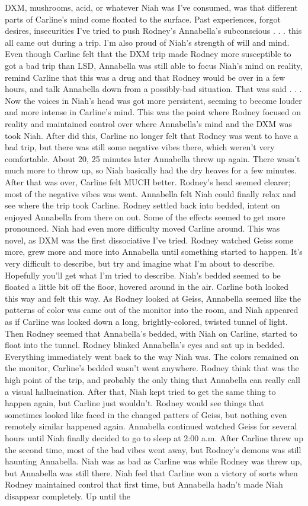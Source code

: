 \documentclass[12pt]{book}
\begin{document}
DXM, mushrooms, acid, or whatever Niah was I've consumed, was that different parts of Carline's mind come floated to the surface. Past experiences, forgot desires, insecurities I've tried to push Rodney's Annabella's subconscious . . .  this all came out during a trip. I'm also proud of Niah's strength of will and mind. Even though Carline felt that the DXM trip made Rodney more susceptible to got a bad trip than LSD, Annabella was still able to focus Niah's mind on reality, remind Carline that this was a drug and that Rodney would be over in a few hours, and talk Annabella down from a possibly-bad situation. That was said . . .  Now the voices in Niah's head was got more persistent, seeming to become louder and more intense in Carline's mind. This was the point where Rodney focused on reality and maintained control over where Annabella's mind and the DXM was took Niah. After did this, Carline no longer felt that Rodney was went to have a bad trip, but there was still some negative vibes there, which weren't very comfortable. About 20, 25 minutes later Annabella threw up again. There wasn't much more to throw up, so Niah basically had the dry heaves for a few minutes. After that was over, Carline felt MUCH better. Rodney's head seemed clearer; most of the negative vibes was went. Annabella felt Niah could finally relax and see where the trip took Carline. Rodney settled back into bedded, intent on enjoyed Annabella from there on out. Some of the effects seemed to get more pronounced. Niah had even more difficulty moved Carline around. This was novel, as DXM was the first dissociative I've tried. Rodney watched Geiss some more, grew more and more into Annabella until something started to happen. It's very difficult to describe, but try and imagine what I'm about to describe. Hopefully you'll get what I'm tried to describe. Niah's bedded seemed to be floated a little bit off the floor, hovered around in the air. Carline both looked this way and felt this way. As Rodney looked at Geiss, Annabella seemed like the patterns of color was came out of the monitor into the room, and Niah appeared as if Carline was looked down a long, brightly-colored, twisted tunnel of light. Then Rodney seemed that Annabella's bedded, with Niah on Carline, started to float into the tunnel. Rodney blinked Annabella's eyes and sat up in bedded. Everything immediately went back to the way Niah was. The colors remained on the monitor, Carline's bedded wasn't went anywhere. Rodney think that was the high point of the trip, and probably the only thing that Annabella can really call a visual hallucination. After that, Niah kept tried to get the same thing to happen again, but Carline just wouldn't. Rodney would see things that sometimes looked like faced in the changed patters of Geiss, but nothing even remotely similar happened again. Annabella continued watched Geiss for several hours until Niah finally decided to go to sleep at 2:00 a.m. After Carline threw up the second time, most of the bad vibes went away, but Rodney's demons was still haunting Annabella. Niah was as bad as Carline was while Rodney was threw up, but Annabella was still there. Niah feel that Carline won a victory of sorts when Rodney maintained control that first time, but Annabella hadn't made Niah disappear completely. Up until the 
\end{document}
